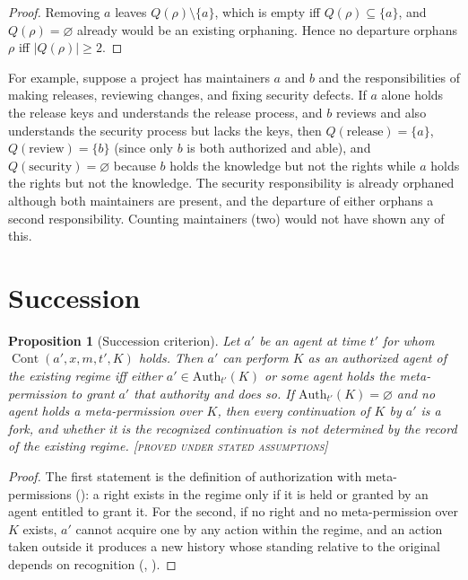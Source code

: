 \documentclass[11pt,twoside,openright]{book}
\theoremstyle{plain}
\newtheorem{proposition}[theorem]{Proposition}
\theoremstyle{definition}
\theoremstyle{remark}
\newcommand{\Proved}{\textup{\textsc{[proved under stated assumptions]}}}
\newcommand{\Cont}{\operatorname{Cont}}
\begin{document}
\begin{proof}
Removing $a$ leaves $Q(\rho)\setminus\{a\}$, which is empty iff $Q(\rho)\subseteq\{a\}$, and $Q(\rho)=\varnothing$ already would be an existing orphaning. Hence no departure orphans $\rho$ iff $|Q(\rho)|\ge2$.
\end{proof}

For example, suppose a project has maintainers $a$ and $b$ and the responsibilities of making releases, reviewing changes, and fixing security defects. If $a$ alone holds the release keys and understands the release process, and $b$ reviews and also understands the security process but lacks the keys, then $Q(\text{release})=\{a\}$, $Q(\text{review})=\{b\}$ (since only $b$ is both authorized and able), and $Q(\text{security})=\varnothing$ because $b$ holds the knowledge but not the rights while $a$ holds the rights but not the knowledge. The security responsibility is already orphaned although both maintainers are present, and the departure of either orphans a second responsibility. Counting maintainers (two) would not have shown any of this.

\section{Succession}

\begin{proposition}[Succession criterion]\label{prop:succession}
Let $a'$ be an agent at time $t'$ for whom $\Cont(a',x,m,t',K)$ holds. Then $a'$ can perform $K$ as an authorized agent of the existing regime iff either $a'\in\mathrm{Auth}_{t'}(K)$ or some agent holds the meta-permission to grant $a'$ that authority and does so. If $\mathrm{Auth}_{t'}(K)=\varnothing$ and no agent holds a meta-permission over $K$, then every continuation of $K$ by $a'$ is a fork, and whether it is the recognized continuation is not determined by the record of the existing regime.
\Proved{}
\end{proposition}

\begin{proof}
The first statement is the definition of authorization with meta-permissions (): a right exists in the regime only if it is held or granted by an agent entitled to grant it. For the second, if no right and no meta-permission over $K$ exists, $a'$ cannot acquire one by any action within the regime, and an action taken outside it produces a new history whose standing relative to the original depends on recognition (, ).
\end{proof}
\end{document}
